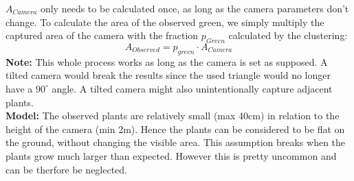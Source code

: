 $A_{Camera}$ only needs to be calculated once, as long as the camera parameters don't change. To calculate the area of the observed green, we simply multiply the captured area of the camera with the fraction $p_{Green}$ calculated by the clustering: 
$$A_{Observed} = p_{green}\cdot A_{Camera}$$
\textbf{Note:} This whole process works as long as the camera is set as supposed. A tilted camera would break the results since the used triangle would no longer have a $90^{\circ}$ angle. A tilted camera might also unintentionally capture adjacent plants.\\
\textbf{Model:} The observed plants are relatively small (max 40cm) in relation to the height of the camera (min 2m). Hence the plants can be considered to be flat on the ground, without changing the visible area. This assumption breaks when the plants grow much larger than expected. However this is pretty uncommon and can be therfore be neglected.
